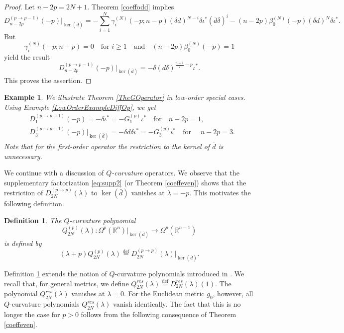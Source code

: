 \documentclass[a4paper,12pt,reqno]{amsart}
\newtheorem{defn}[theorem]{Definition}
\newtheorem{example}[theorem]{Example}
\numberwithin{theorem}{subsection}
\numberwithin{equation}{section}
\begin{document}
\begin{proof} Let $n-2p=2N+1$. Theorem \ref{coeffodd} implies
\begin{equation*}
   D^{(p\to p-1)}_{n-2p}(-p)|_{\ker(\bar{d})} = - \sum_{i=1}^N
   \gamma_i^{(N)}(-p;n\!-\!p) (\delta {d})^{N-i} \delta \iota^* (\bar{d} \bar{\delta})^i
   - (n\!-\!2p) \beta_0^{(N)}(-p) (\delta {d})^{N} \delta \iota^*.
\end{equation*}
But
$$
   \gamma_i^{(N)}(-p;n\!-\!p) = 0 \quad \mbox{for $i \ge 1$}
   \quad \mbox{and} \quad (n\!-\!2p) \beta^{(N)}_0(-p) = 1
$$
yield the result
\begin{equation*}
   D^{(p\to p-1)}_{n-2p}(-p)|_{\ker(\bar{d})} = -\delta ({d}\delta)^{\frac{n-1}{2}-p}\iota^*.
\end{equation*}
This proves the assertion.
\end{proof}

\begin{example} We illustrate Theorem \ref{TheGOperator} in low-order special cases. Using Example
\ref{LowOrderExampleDiffOp}, we get
\begin{align*}
   & D_1^{(p\to p-1)}(-p) = -\delta\iota^* = -G_1^{(p)} \iota^* \quad \text{for}\quad n-2p=1,\\
   & D_3^{(p\to p-1)}(-p)|_{\ker(\bar{d})} = -\delta {d}\delta\iota^* = -G_3^{(p)}
   \iota^* \quad \text{for }\quad n-2p=3.
\end{align*}
Note that for the first-order operator the  restriction to the kernel of
$\bar{d}$ is unnecessary.
\end{example}

We continue with a discussion of {\em $Q$-curvature} operators. We observe that
the supplementary factorization \eqref{eq:supp2} (or Theorem \ref{coeffeven})
shows that the restriction of $D_{2N}^{(p\to p)}(\lambda)$ to $\ker(\bar{d})$
vanishes at $\lambda=-p$. This motivates the following definition.

\begin{defn}\label{QCurvPoly} The $Q$-curvature polynomial
$$
   Q^{(p)}_{2N}(\lambda): \Omega^p({\mathbb{R}}^n)|_{\ker(\bar{d})} \to \Omega^p({\mathbb{R}}^{n-1})
$$
is defined by
\begin{equation}\label{Q-poly}
   (\lambda+p) Q^{(p)}_{2N}(\lambda) {\stackrel{\text{def}}{=}} D_{2N}^{(p \to p)}(\lambda)|_{\ker(\bar{d})}.
\end{equation}
\end{defn}

Definition \ref{QCurvPoly} extends the notion of $Q$-curvature polynomials
introduced in \cite{Juhl}. We recall that, for general metrics, we define
$Q^{res}_{2N}(\lambda) {\stackrel{\text{def}}{=}} D^{res}_{2N}(\lambda)(1)$. The polynomial
$Q^{res}_{2N}(\lambda)$ vanishes at $\lambda=0$. For the Euclidean metric
$g_0$, however, all $Q$-curvature polynomials $Q^{res}_{2N}(\lambda)$ vanish
identically. The fact that this is no longer the case for $p>0$ follows from
the following consequence of Theorem \ref{coeffeven}.
\end{document}
